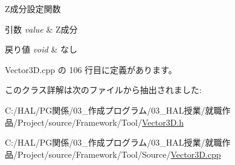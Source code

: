 Z成分設定関数 


\begin{DoxyParams}{引数}
{\em value} & Z成分 \\
\hline
\end{DoxyParams}

\begin{DoxyRetVals}{戻り値}
{\em void} & なし \\
\hline
\end{DoxyRetVals}


 Vector3\+D.\+cpp の 106 行目に定義があります。



このクラス詳解は次のファイルから抽出されました\+:\begin{DoxyCompactItemize}
\item 
C\+:/\+H\+A\+L/\+P\+G関係/03\+\_\+作成プログラム/03\+\_\+\+H\+A\+L授業/就職作品/\+Project/source/\+Framework/\+Tool/\mbox{\hyperlink{_vector3_d_8h}{Vector3\+D.\+h}}\item 
C\+:/\+H\+A\+L/\+P\+G関係/03\+\_\+作成プログラム/03\+\_\+\+H\+A\+L授業/就職作品/\+Project/source/\+Framework/\+Tool/\+Source/\mbox{\hyperlink{_vector3_d_8cpp}{Vector3\+D.\+cpp}}\end{DoxyCompactItemize}
